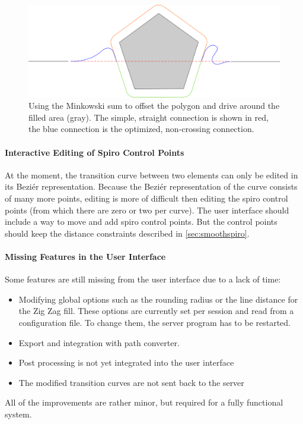 \begin{figure}
\includegraphics[width=\textwidth]{images/conclusion/minkowski_crossing_avoidance.pdf}
\caption{Using the Minkowski sum to offset the polygon and drive around the filled area (gray). The simple, straight connection is shown in red, the blue connection is the optimized, non-crossing connection.}
\end{figure}

\paragraph{Interactive Editing of Spiro Control Points} At the moment, the transition curve between two elements can only be edited in its Beziér representation. Because the Beziér representation of the curve consists of many more points, editing is more of difficult then editing the spiro control points (from which there are zero or two per curve). The user interface should include a way to move and add spiro control points. But the control points should keep the distance constraints described in \autoref{sec:smoothspiro}.

\paragraph{Missing Features in the User Interface} Some features are still missing from the user interface due to a lack of time: 

\begin{itemize}
\item Modifying global options such as the rounding radius or the line distance for the Zig Zag fill. These options are currently set per session and read from a configuration file. To change them, the server program has to be restarted.
\item Export and integration with path converter.
\item Post processing is not yet integrated into the user interface
\item The modified transition curves are not sent back to the server
\end{itemize}

All of the improvements are rather minor, but required for a fully functional system.